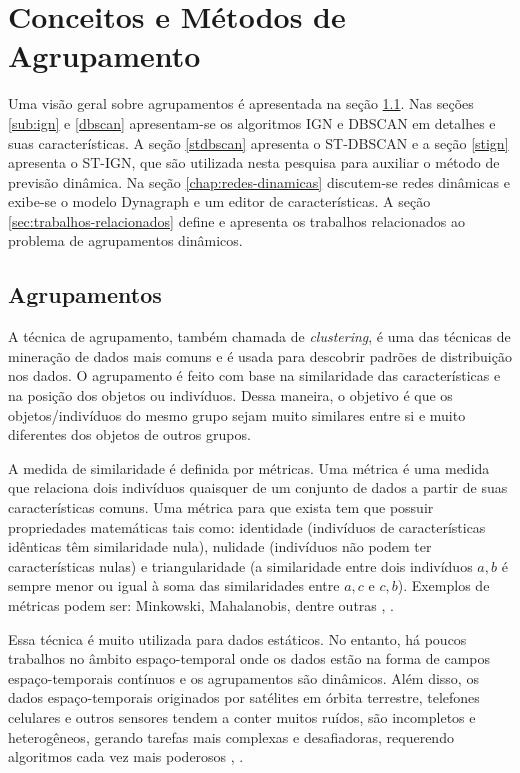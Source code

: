 \chapter{Conceitos e Métodos de Agrupamento}
\label{chap:estadodaarte}

Uma visão geral sobre agrupamentos é apresentada na seção \ref{agrupamentos}. Nas seções \ref{sub:ign} e \ref{dbscan} apresentam-se os algoritmos \acrshort{IGN} e \acrshort{DBSCAN} em detalhes e suas características. A seção \ref{stdbscan} apresenta o \acrshort{ST-DBSCAN} e a seção \ref{stign} apresenta o \acrshort{ST-IGN}, que são utilizada nesta pesquisa para auxiliar o método de previsão dinâmica. Na seção \ref{chap:redes-dinamicas} discutem-se redes dinâmicas e exibe-se o modelo Dynagraph e um editor de características. A seção \ref{sec:trabalhos-relacionados} define e apresenta os trabalhos relacionados ao problema de agrupamentos dinâmicos.

\section{Agrupamentos}
\label{agrupamentos}

A técnica de agrupamento, também chamada de \textit{clustering}, é uma das técnicas de mineração de dados mais comuns e é usada para descobrir padrões de distribuição nos dados. O agrupamento é feito com base na similaridade das características e na posição dos objetos ou indivíduos. Dessa maneira, o objetivo é que os objetos/indivíduos do mesmo grupo sejam muito similares entre si e muito diferentes dos objetos de outros grupos.

A medida de similaridade é definida por métricas. Uma métrica é uma medida que relaciona dois indivíduos quaisquer de um conjunto de dados a partir de suas características comuns. Uma métrica para que exista tem que possuir propriedades matemáticas tais como: identidade (indivíduos de características idênticas têm similaridade nula), nulidade (indivíduos não podem ter características nulas) e triangularidade (a similaridade entre dois indivíduos $a,b$ é sempre menor ou igual à soma das similaridades entre $a,c$ e $c,b$). Exemplos de métricas podem ser: Minkowski, Mahalanobis, dentre outras \cite{Minkowski:2012}, \cite{Mahalanobis:1993}.

Essa técnica é muito utilizada para dados estáticos. No entanto, há poucos trabalhos no âmbito espaço-temporal onde os dados estão na forma de campos espaço-temporais contínuos e os agrupamentos são dinâmicos. Além disso, os dados espaço-temporais originados por satélites em órbita terrestre, telefones celulares e outros sensores tendem a conter muitos ruídos, são incompletos e heterogêneos, gerando tarefas mais complexas e desafiadoras, requerendo algoritmos cada vez mais poderosos \cite{faghmous2013}, \cite{Mitsa:2010}.


